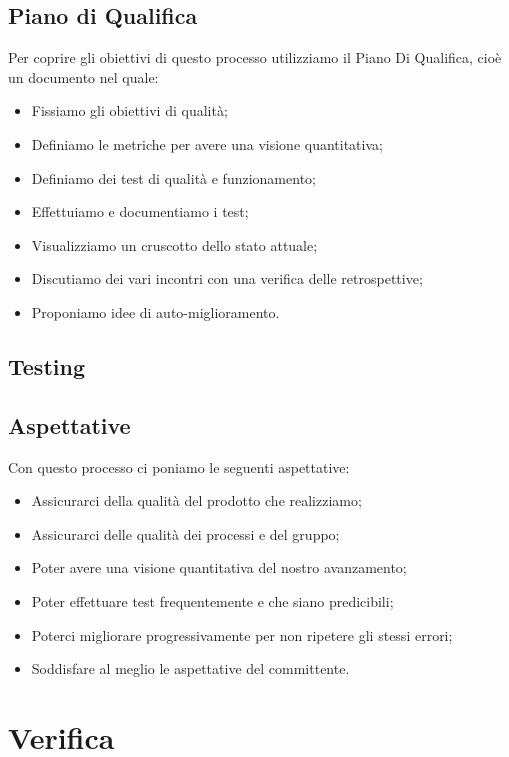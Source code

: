 \subsection{Piano di Qualifica}
Per coprire gli obiettivi di questo processo utilizziamo il Piano Di
Qualifica, cioè un documento nel quale:
\begin{itemize}
    \item Fissiamo gli obiettivi di qualità;
    \item Definiamo le metriche per avere una visione quantitativa;
    \item Definiamo dei test di qualità e funzionamento;
    \item Effettuiamo e documentiamo i test;
    \item Visualizziamo un cruscotto dello stato attuale;
	  \item Discutiamo dei vari incontri con una verifica delle retrospettive;
    \item Proponiamo idee di auto-miglioramento.
\end{itemize}

\subsection{Testing}

\subsection{Aspettative}
Con questo processo ci poniamo le seguenti aspettative:
\begin{itemize}
    \item Assicurarci della qualità del prodotto che realizziamo;
    \item Assicurarci delle qualità dei processi e del gruppo;
    \item Poter avere una visione quantitativa del nostro avanzamento;
    \item Poter effettuare test frequentemente e che siano predicibili;
    \item Poterci migliorare progressivamente per non ripetere gli stessi errori;
    \item Soddisfare al meglio le aspettative del committente.
\end{itemize}


\section{Verifica}
